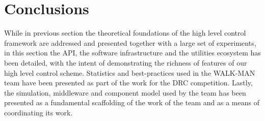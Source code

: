 \section{Conclusions}
While in previous section the theoretical foundations of the high level control framework are addressed and presented together with a large set of experiments, in this section the API, the software infrastructure and the utilities ecosystem has been detailed, with the intent of demonstrating the richness of features of our high level control scheme.
Statistics and best-practices used in the WALK-MAN team have been presented as part of the work for the DRC competition. Lastly, the simulation, middleware and component model used by the team has been presented as a fundamental scaffolding of the work of the team and as a means of coordinating its work.
